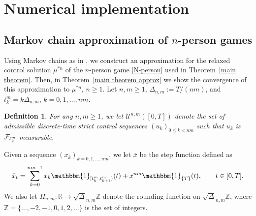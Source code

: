 \documentclass[12pt]{article}
\newtheorem{definition}[prop]{Definition}
\theoremstyle{named}
\numberwithin{equation}{section}
\let\oldcitet=\citet
\renewcommand{\cite}[1]{\textcolor[rgb]{0,0,1}{\oldcitet{#1}}}
\renewcommand{\citet}[1]{\textcolor[rgb]{0,0,1}{\oldcitet{#1}}}
\begin{document}
\section{Numerical implementation}
\subsection{Markov chain approximation of $n$-person games}
\label{sec:markovchain_approx}
 Using Markov chains as in \cite{kushner1990numerical},
 we construct an approximation for
 the relaxed control solution
 $\mu^{*n}$ of the $n$-person game
 \eqref{N-person}  used in Theorem~\ref{main theorem}.
 Then, in Theorem~\ref{main theorem approx} we
 show the convergence of this approximation to
 $\mu^{*n}$, $n\geq 1$.
 Let $n, m \geq 1$, $\Delta_{{n},{m}} := {T}/({n}{m})$,
 and $t^m_k = k \Delta_{n,m}$, $k = 0, 1, \ldots , {n}{m}$.
\begin{definition}
  For any $n, m \geq 1$, we let $\mathcal{U}^{{n},{m}}([0,T])$ denote the set of
  admissible discrete-time strict control sequences $(u_k)_{0 \leq k < nm}$
  such that $u_k$ is ${\cal F}_{t^m_k}$-measurable.
\end{definition}
\noindent
 Given a sequence $(x_k)_{k = 0,1, \ldots , {n}{m}}$, we let
 $\bar{x}$ be the step function defined as
 $$
 \bar{x}_t = \sum_{k=0}^{nm-1} x_k \mathbbm{1}_{[t^m_k,t^m_{k+1})} (t)
   + x^{nm} \mathbbm{1}_{\{ T\}} (t),
 \qquad t\in [0,T].
 $$
 We also let
 $H_{{n},{m}}:\mathbb{R} \to \sqrt{\Delta}_{{n},{m}}\mathbb{Z}$ denote
 the rounding function on
 $\sqrt{\Delta}_{{n},{m}}\mathbb{Z}$,
      where $\mathbb{Z} = \{ \ldots , -2, -1 , 0 , 1 , 2 , \ldots \}$
      is the set of integers.
\end{document}
